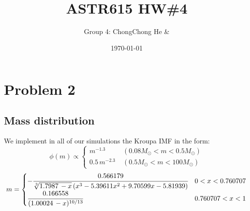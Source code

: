 



\title{ASTR615 HW\#4}
\author{Group 4: ChongChong He \& }
\date{\today}
\maketitle

\section*{Problem 2}
\subsection{Mass distribution}
We implement in all of our simulations the Kroupa IMF in the form:
\begin{equation}
\phi(m) \propto 
\begin{cases}
m^{-1.3} \; &(0.08M_\odot < m < 0.5M_\odot) \\
0.5 \, m^{-2.3} \; &(0.5M_\odot<m<100M_\odot)
\end{cases}
\end{equation}
\begin{equation}
m=
	\begin{cases}
	-\cfrac{0.566179}{\sqrt[3]{1.7987\, - x} \left(x^3-5.39611 
	x^2+9.70599 x-5.81939\right)} & 0<x<0.760707\\
	\cfrac{0.166558}{(1.00024\, -x)^{10/13}} & 0.760707<x<1
	\end{cases}
\end{equation}

